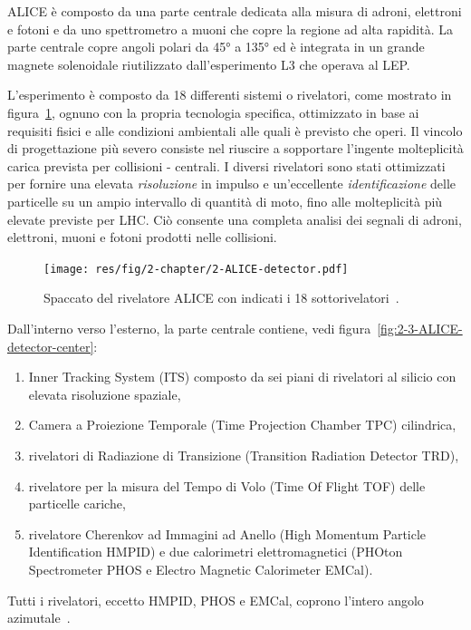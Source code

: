     ALICE è composto da una parte centrale dedicata alla misura di adroni, elettroni e fotoni e da uno spettrometro a muoni che copre la regione ad alta rapidità. La parte centrale copre angoli polari da \ang{45} a \ang{135} ed è integrata in un grande magnete solenoidale riutilizzato dall’esperimento L3 che operava al LEP.
    
    L’esperimento è composto da 18 differenti sistemi o rivelatori, come mostrato in figura~\ref{fig:2-2-ALICE-detector}, ognuno con la propria tecnologia specifica, ottimizzato in base ai requisiti fisici e alle condizioni ambientali alle quali è previsto che operi. Il vincolo di progettazione più severo consiste nel riuscire a sopportare l’ingente molteplicità carica prevista per collisioni - centrali. I diversi rivelatori sono stati ottimizzati per fornire una elevata \textit{risoluzione} in impulso e un’eccellente \textit{identificazione} delle particelle su un ampio intervallo di quantità di moto, fino alle molteplicità più elevate previste per LHC. Ciò consente una completa analisi dei segnali di adroni, elettroni, muoni e fotoni prodotti nelle collisioni.

    \begin{figure}[t]
        \centering
        \texttt{[image: res/fig/2-chapter/2-ALICE-detector.pdf]}
        \caption{Spaccato del rivelatore ALICE con indicati i 18 sottorivelatori~\cite{Tauro_2017}.}
        \label{fig:2-2-ALICE-detector}
    \end{figure}
    
    Dall’interno verso l’esterno, la parte centrale contiene, vedi figura~\ref{fig:2-3-ALICE-detector-center}:
    \begin{enumerate}
        \item Inner Tracking System (ITS) composto da sei piani di rivelatori al silicio con elevata risoluzione spaziale,

        \item Camera a Proiezione Temporale (Time Projection Chamber TPC) cilindrica,
        
        \item rivelatori di Radiazione di Transizione (Transition Radiation Detector TRD),

        \item rivelatore per la misura del Tempo di Volo (Time Of Flight TOF) delle particelle cariche,

        \item rivelatore Cherenkov ad Immagini ad Anello (High Momentum Particle Identification HMPID) e due calorimetri elettromagnetici (PHOton Spectrometer PHOS e Electro Magnetic Calorimeter EMCal).
    \end{enumerate}
    Tutti i rivelatori, eccetto HMPID, PHOS e EMCal, coprono l’intero angolo azimutale~\cite{ALICE_2008}.

